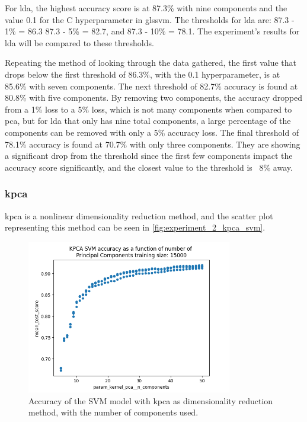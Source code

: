 For \gls{lda}, the highest accuracy score is at 87.3\% with nine components and the value 0.1 for the C hyperparameter in gls{svm}. The thresholds for \gls{lda} are: 87.3 - 1\% = 86.3 87.3 - 5\% = 82.7, and 87.3 - 10\% = 78.1. The experiment's results for \gls{lda} will be compared to these thresholds.

Repeating the method of looking through the data gathered, the first value that drops below the first threshold  of 86.3\%, with the 0.1 hyperparameter, is at 85.6\% with seven components.
The next threshold of 82.7\% accuracy is found at 80.8\% with five components. By removing two components, the accuracy dropped from a 1\% loss to a 5\% loss, which is not many components when compared to \gls{pca}, but for \gls{lda} that only has nine total components, a large percentage of the components can be removed with only a 5\% accuracy loss.
The final threshold of 78.1\% accuracy is found at 70.7\% with only three components. They are showing a significant drop from the threshold since the first few components impact the accuracy score significantly, and the closest value to the threshold is ~8\% away.


\subsubsection{\gls{kpca}}\label{subsubsec:experiment_2_kpca}
\gls{kpca} is a nonlinear dimensionality reduction method, and the scatter plot representing this method can be seen in \autoref{fig:experiment_2_kpca_svm}.

\begin{figure}[htb!]
    \centering
    \includegraphics[width=0.8\textwidth]{figures/experiment_two/kpca_svm_15000.png}
    \caption{Accuracy of the SVM model with \gls{kpca} as dimensionality reduction method, with the number of components used.}
    \label{fig:experiment_2_kpca_svm}
\end{figure}

